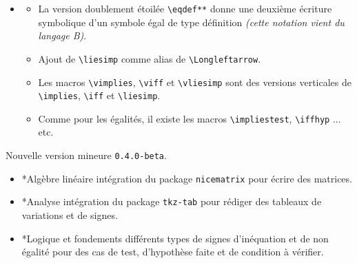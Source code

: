\documentclass[12pt,a4paper]{book}
\makeatletter
\newcommand\env[1]{\texttt{#1}}
\newcommand\macro[1]{\env{\textbackslash{}#1}}
\theoremstyle{definition}
\newcommand\topic{\@ifstar{\@topic@star}{\@topic@no@star}}
\newcommand\@topic@no@star[1]{%
	\textbf{\textsc{#1}.}%
}
\newcommand\@topic@star[1]{%
	\textbf{\textsc{#1} :}%
}
\makeatother
\begin{document}
{{\begin{description}
\begin{itemize}[itemsep=.5em]
    
    
    
        \item \topic{Logique}
        \begin{itemize}[itemsep=.5em]
            \item La version doublement étoilée \macro{eqdef**} donne une deuxième écriture symbolique d'un symbole égal de type définition \emph{(cette notation vient du langage B)}.
    
            \item Ajout de \macro{liesimp} comme alias de \macro{Longleftarrow}.
    
            \item Les macros \macro{vimplies}, \macro{viff} et \macro{vliesimp} sont des versions verticales de \macro{implies}, \macro{iff} et \macro{liesimp}.
    
            \item Comme pour les égalités, il existe les macros \macro{impliestest}, \macro{iffhyp} ... etc.
        \end{itemize}
    \end{itemize}


    \medskip
    \item[2019-09-06] Nouvelle version mineure \verb+0.4.0-beta+.
    
    \begin{itemize}[itemsep=.5em]
        \item \topic*{Algèbre linéaire}
              intégration du package \verb+nicematrix+ pour écrire des matrices.
    
    
    
    
        \item \topic*{Analyse}
              intégration du package \verb+tkz-tab+ pour rédiger des tableaux de variations et de signes.
    
    
    
    
        \item \topic*{Logique et fondements}
              différents types de signes d'inéquation et de non égalité pour des cas de test, d'hypothèse faite et de condition à vérifier.
    
    \end{itemize}


\end{description}


}}
\end{document}
